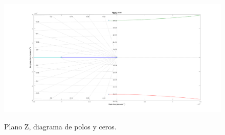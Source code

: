 \begin{figure}[H]
	\centering
	\includegraphics[width=0.9\linewidth]{ImagenesParteIII/Rlocus.png}
	\label{fig:zplane}
	\caption{Plano Z, diagrama de polos y ceros.}
\end{figure}

%